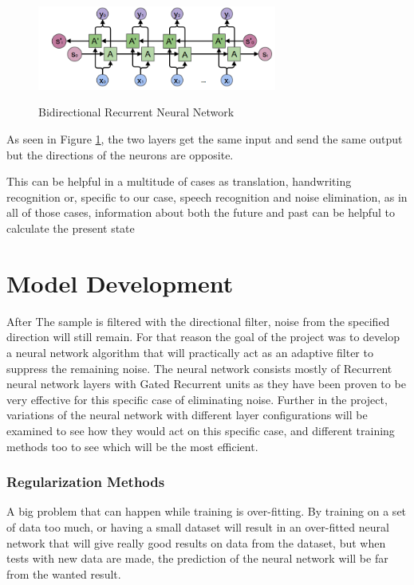 \begin{figure}[htp]
	\centering
	\includegraphics[width=0.7\textwidth]{Illustrations/BRNN.png}
	\caption{Bidirectional Recurrent Neural Network}\cite{BIDIPHOTO}
	\label{fig:BRNN}
\end{figure}
As seen in Figure \ref{fig:BRNN}, the two layers get the same input and send the same output but the directions of the neurons are opposite.

This can be helpful in a multitude of cases as translation, handwriting recognition or, specific to our case, speech recognition and noise elimination, as in all of those cases, information about both the future and past can be helpful to calculate the present state 
\section{Model Development}

After The sample is filtered with the directional filter, noise from the specified direction will still remain. For that reason the goal of the project was to develop a neural network algorithm that will practically act as an adaptive filter to suppress the remaining noise. The neural network consists mostly of Recurrent neural network layers with Gated Recurrent units as they have been proven to be very effective for this specific case of eliminating noise. Further in the project, variations of the neural network with different layer configurations will be examined to see how they would act on this specific case, and different training methods too to see which will be the most efficient.

\subsubsection{Regularization Methods}
A big problem that can happen while training is over-fitting. By training on a set of data too much, or having a small dataset will result in an over-fitted neural network that will give really good results on data from the dataset, but when tests with new data are made, the prediction of the neural network will be far from the wanted result.


